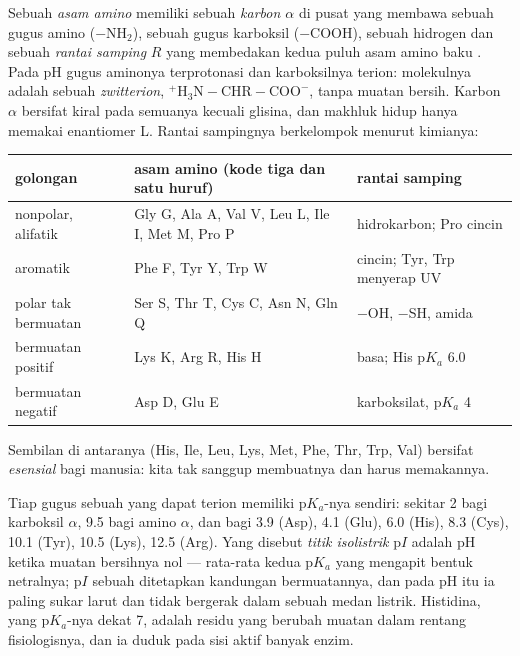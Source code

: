 \begin{definition}\label{def:b1:proteins:aminoacid}
Sebuah \emph{asam amino} memiliki sebuah \emph{karbon
$\alpha$} di pusat yang membawa sebuah gugus amino ($-\mathrm{NH_2}$),
sebuah gugus karboksil ($-\mathrm{COOH}$), sebuah hidrogen dan sebuah
\emph{rantai samping} $R$ yang membedakan kedua
puluh asam amino baku . Pada pH  gugus aminonya terprotonasi
dan karboksilnya terion: molekulnya adalah sebuah
\emph{zwitterion},
$\mathrm{^+H_3N{-}CHR{-}COO^-}$, tanpa muatan bersih. Karbon $\alpha$
bersifat kiral pada semuanya kecuali glisina, dan makhluk hidup hanya
memakai enantiomer L. Rantai sampingnya berkelompok menurut kimianya:
\begin{center}
\footnotesize
\begin{tabular}{lll}
\hline
golongan & asam amino (kode tiga dan satu huruf) & rantai samping \\
\hline
nonpolar, alifatik & Gly G, Ala A, Val V, Leu L, Ile I, Met M, Pro P & hidrokarbon; Pro cincin \\
aromatik & Phe F, Tyr Y, Trp W & cincin; Tyr, Trp menyerap UV \\
polar tak bermuatan & Ser S, Thr T, Cys C, Asn N, Gln Q & $-$OH, $-$SH, amida \\
bermuatan positif & Lys K, Arg R, His H & basa; His p$K_a$ 6.0 \\
bermuatan negatif & Asp D, Glu E & karboksilat, p$K_a$ 4 \\
\hline
\end{tabular}
\end{center}
Sembilan di antaranya (His, Ile, Leu, Lys, Met, Phe, Thr, Trp, Val)
bersifat \emph{esensial} bagi manusia: kita tak sanggup membuatnya dan
harus memakannya.
\end{definition}

\begin{proposition}[Pengionan]\label{prop:b1:proteins:ionisation}
Tiap gugus sebuah  yang dapat terion memiliki p$K_a$-nya
sendiri: sekitar 2 bagi karboksil $\alpha$, 9.5 bagi amino $\alpha$, dan
bagi  3.9 (Asp), 4.1 (Glu), 6.0 (His), 8.3 (Cys), 10.1
(Tyr), 10.5 (Lys), 12.5 (Arg). Yang disebut \emph{titik
isolistrik} p$I$ adalah pH ketika muatan
bersihnya nol --- rata-rata kedua p$K_a$ yang mengapit bentuk netralnya;
p$I$ sebuah  ditetapkan kandungan  bermuatannya,
dan pada pH itu ia paling sukar larut dan tidak bergerak dalam sebuah
medan listrik. Histidina, yang p$K_a$-nya dekat 7, adalah residu yang
berubah muatan dalam rentang fisiologisnya, dan ia duduk pada sisi aktif
banyak enzim.
\end{proposition}


